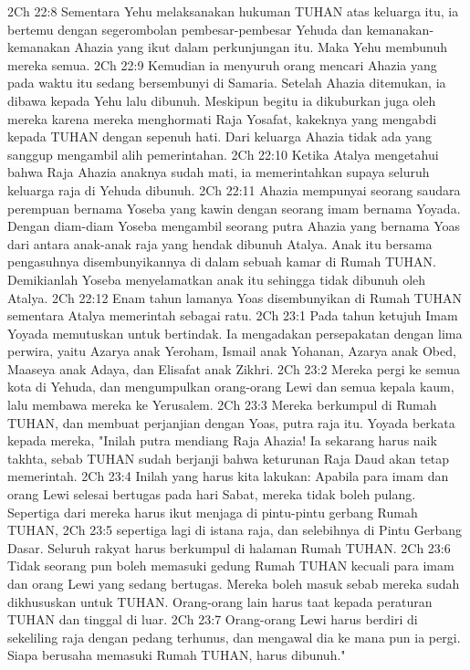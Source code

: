 2Ch 22:8  Sementara Yehu melaksanakan hukuman TUHAN atas keluarga itu, ia bertemu dengan segerombolan pembesar-pembesar Yehuda dan kemanakan-kemanakan Ahazia yang ikut dalam perkunjungan itu. Maka Yehu membunuh mereka semua.
2Ch 22:9  Kemudian ia menyuruh orang mencari Ahazia yang pada waktu itu sedang bersembunyi di Samaria. Setelah Ahazia ditemukan, ia dibawa kepada Yehu lalu dibunuh. Meskipun begitu ia dikuburkan juga oleh mereka karena mereka menghormati Raja Yosafat, kakeknya yang mengabdi kepada TUHAN dengan sepenuh hati. Dari keluarga Ahazia tidak ada yang sanggup mengambil alih pemerintahan.
2Ch 22:10  Ketika Atalya mengetahui bahwa Raja Ahazia anaknya sudah mati, ia memerintahkan supaya seluruh keluarga raja di Yehuda dibunuh.
2Ch 22:11  Ahazia mempunyai seorang saudara perempuan bernama Yoseba yang kawin dengan seorang imam bernama Yoyada. Dengan diam-diam Yoseba mengambil seorang putra Ahazia yang bernama Yoas dari antara anak-anak raja yang hendak dibunuh Atalya. Anak itu bersama pengasuhnya disembunyikannya di dalam sebuah kamar di Rumah TUHAN. Demikianlah Yoseba menyelamatkan anak itu sehingga tidak dibunuh oleh Atalya.
2Ch 22:12  Enam tahun lamanya Yoas disembunyikan di Rumah TUHAN sementara Atalya memerintah sebagai ratu.
2Ch 23:1  Pada tahun ketujuh Imam Yoyada memutuskan untuk bertindak. Ia mengadakan persepakatan dengan lima perwira, yaitu Azarya anak Yeroham, Ismail anak Yohanan, Azarya anak Obed, Maaseya anak Adaya, dan Elisafat anak Zikhri.
2Ch 23:2  Mereka pergi ke semua kota di Yehuda, dan mengumpulkan orang-orang Lewi dan semua kepala kaum, lalu membawa mereka ke Yerusalem.
2Ch 23:3  Mereka berkumpul di Rumah TUHAN, dan membuat perjanjian dengan Yoas, putra raja itu. Yoyada berkata kepada mereka, "Inilah putra mendiang Raja Ahazia! Ia sekarang harus naik takhta, sebab TUHAN sudah berjanji bahwa keturunan Raja Daud akan tetap memerintah.
2Ch 23:4  Inilah yang harus kita lakukan: Apabila para imam dan orang Lewi selesai bertugas pada hari Sabat, mereka tidak boleh pulang. Sepertiga dari mereka harus ikut menjaga di pintu-pintu gerbang Rumah TUHAN,
2Ch 23:5  sepertiga lagi di istana raja, dan selebihnya di Pintu Gerbang Dasar. Seluruh rakyat harus berkumpul di halaman Rumah TUHAN.
2Ch 23:6  Tidak seorang pun boleh memasuki gedung Rumah TUHAN kecuali para imam dan orang Lewi yang sedang bertugas. Mereka boleh masuk sebab mereka sudah dikhususkan untuk TUHAN. Orang-orang lain harus taat kepada peraturan TUHAN dan tinggal di luar.
2Ch 23:7  Orang-orang Lewi harus berdiri di sekeliling raja dengan pedang terhunus, dan mengawal dia ke mana pun ia pergi. Siapa berusaha memasuki Rumah TUHAN, harus dibunuh."
